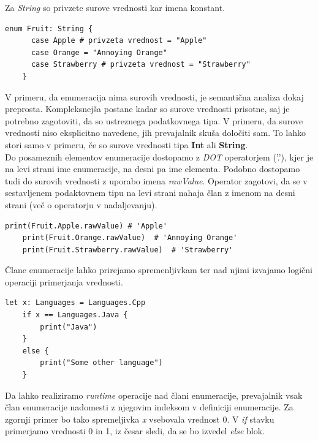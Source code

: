 \documentclass[a4paper, 12p]{book}
\begin{document}
\indent Za \textit{String} so privzete surove vrednosti kar imena konstant.

\begin{lstlisting}[caption={Enumeracija s surovimi vrednostmi tipa String.}, captionpos=b, label={lst:fruitEnumeration}]
	enum Fruit: String {
	  case Apple # privzeta vrednost = "Apple"
	  case Orange = "Annoying Orange"
	  case Strawberry # privzeta vrednost = "Strawberry"
	}
\end{lstlisting}

\indent V primeru, da enumeracija nima surovih vrednosti, je semantična analiza dokaj preprosta. Kompleksnejša postane kadar so surove vrednosti prisotne, saj je potrebno zagotoviti, da so ustreznega podatkovnega tipa. V primeru, da surove vrednosti niso eksplicitno navedene, jih prevajalnik skuša določiti sam. To lahko stori samo v primeru, če so surove vrednosti tipa \textbf{Int} ali \textbf{String}. \\
\indent Do posameznih elementov enumeracije dostopamo z \textit{DOT} operatorjem ('.'), kjer je na levi strani ime enumeracije, na desni pa ime elementa. Podobno dostopamo tudi do surovih vrednosti z uporabo imena \textit{rawValue}. Operator zagotovi, da se v sestavljenem podaktovnem tipu na levi strani nahaja član z imenom na desni strani (več o operatorju v nadaljevanju).

\begin{lstlisting}[caption={Primer dostopa do elementov enumeracije ~\ref{lst:fruitEnumeration}.}, captionpos=b]
	print(Fruit.Apple.rawValue) # 'Apple'
	print(Fruit.Orange.rawValue)  # 'Annoying Orange'
	print(Fruit.Strawberry.rawValue)  # 'Strawberry'
\end{lstlisting}

Člane enumeracije lahko prirejamo spremenljivkam ter nad njimi izvajamo logični operaciji primerjanja vrednosti. 

\begin{lstlisting}[caption={}, captionpos=b]
	let x: Languages = Languages.Cpp
	if x == Languages.Java {
	    print("Java")
	}
	else {
	    print("Some other language")
	}
\end{lstlisting}

Da lahko realiziramo \textit{runtime} operacije nad člani enumeracije, prevajalnik vsak član enumeracije nadomesti z njegovim indeksom v definiciji enumeracije. Za zgornji primer bo tako spremeljivka \textit{x} vsebovala vrednost 0. V \textit{if} stavku primerjamo vrednosti 0 in 1, iz česar sledi, da se bo izvedel \textit{else} blok.
\end{document}
